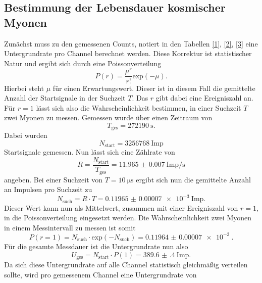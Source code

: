 \subsection{Bestimmung der Lebensdauer kosmischer Myonen}
Zunächst muss zu den gemessenen Counts, notiert in den Tabellen \ref{1}, \ref{2}, \ref{3} eine Untergrundrate pro Channel berechnet werden. Diese Korrektur ist statistischer Natur und ergibt sich durch eine Poissonverteilung \cite{poisson}
\begin{equation*}
P(r) = \frac{\mu^r}{r!}\text{exp}(-\mu).
\end{equation*}
Hierbei steht $\mu$ für einen Erwartungswert. Dieser ist in diesem Fall die gemittelte Anzahl der Startsignale in der Suchzeit $T$. Das $r$ gibt dabei eine Ereigniszahl an. Für $r = 1$ lässt sich
also die Wahrscheinlichkeit bestimmen, in einer Suchzeit $T$ zwei Myonen zu messen.
Gemessen wurde über einen Zeitraum von
\begin{equation*}
T_\text{ges} = \SI{272190}{\second}.
\end{equation*}
Dabei wurden  
\begin{equation*}
    N_\text{start} = \SI{3256768}{{\text{Imp}}}
\end{equation*}
Startsignale gemessen.
Nun lässt sich eine Zählrate von
\begin{equation*}
R = \frac{N_\text{start}}{T_\text{ges}} = \SI{11.965(7)}{{\text{Imp}}\per\second}
\end{equation*}
angeben. Bei einer Suchzeit von $T = \SI{10}{\micro\second}$ ergibt sich nun die gemittelte Anzahl an Impulsen pro Suchzeit zu
\begin{equation*}
    N_{\text{such}} = R \cdot T = \SI{0.11965(7)e-3}{{\text{Imp}}}.
\end{equation*}
Dieser Wert kann nun als Mittelwert, zusammen mit einer Ereigniszahl von $r = 1$, in die Poissonverteilung eingesetzt werden.
Die Wahrscheinlichkeit zwei Myonen in einem Messintervall zu messen ist somit 
\begin{equation*}
P(r=1) = N_{\text{such}} \cdot \text{exp}(-N_{\text{such}}) = \SI{0.11964(7)e-3}{}.
\end{equation*}
Für die gesamte Messdauer ist die Untergrundrate nun also
\begin{equation*}
    U_{\text{ges}} = N_{\text{start}} \cdot P(1) = \SI{389.6(4)}{\text{Imp}}.
\end{equation*}
Da sich diese Untergrundrate auf alle Channel statistisch gleichmäßig verteilen sollte, wird pro gemessenem Channel eine Untergrundrate von
